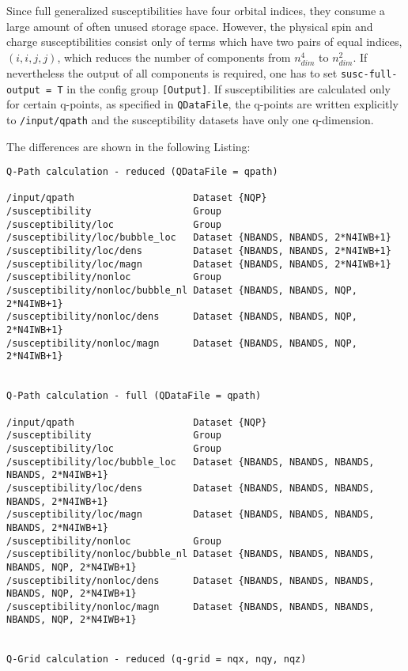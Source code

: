 \documentclass[a4paper,11pt]{article}
\numberwithin{equation}{section} %
\begin{document}
\newpage
Since full generalized susceptibilities have four orbital indices, they consume a large amount of often unused storage space. However, the physical spin and charge susceptibilities
consist only of terms which have two pairs of equal indices, $(i,i,j,j)$, which reduces the number of components from $n_{dim}^4$ to $n_{dim}^2$.
If nevertheless the output of all components is required,
one has to set \verb|susc-full-output = T| in the config group {\color{red}\verb|[Output]|}.
If susceptibilities are calculated only for certain q-points, as specified in \verb|QDataFile|, the q-points are
written explicitly to \verb|/input/qpath| and the susceptibility datasets have only one q-dimension.

The differences are shown in the following Listing:

\begin{lstlisting}[caption=susceptibility output comparison, frame=single, basicstyle=\scriptsize]
Q-Path calculation - reduced (QDataFile = qpath)

/input/qpath                     Dataset {NQP}
/susceptibility                  Group
/susceptibility/loc              Group
/susceptibility/loc/bubble_loc   Dataset {NBANDS, NBANDS, 2*N4IWB+1}
/susceptibility/loc/dens         Dataset {NBANDS, NBANDS, 2*N4IWB+1}
/susceptibility/loc/magn         Dataset {NBANDS, NBANDS, 2*N4IWB+1}
/susceptibility/nonloc           Group
/susceptibility/nonloc/bubble_nl Dataset {NBANDS, NBANDS, NQP, 2*N4IWB+1}
/susceptibility/nonloc/dens      Dataset {NBANDS, NBANDS, NQP, 2*N4IWB+1}
/susceptibility/nonloc/magn      Dataset {NBANDS, NBANDS, NQP, 2*N4IWB+1}


Q-Path calculation - full (QDataFile = qpath)

/input/qpath                     Dataset {NQP}
/susceptibility                  Group
/susceptibility/loc              Group
/susceptibility/loc/bubble_loc   Dataset {NBANDS, NBANDS, NBANDS, NBANDS, 2*N4IWB+1}
/susceptibility/loc/dens         Dataset {NBANDS, NBANDS, NBANDS, NBANDS, 2*N4IWB+1}
/susceptibility/loc/magn         Dataset {NBANDS, NBANDS, NBANDS, NBANDS, 2*N4IWB+1}
/susceptibility/nonloc           Group
/susceptibility/nonloc/bubble_nl Dataset {NBANDS, NBANDS, NBANDS, NBANDS, NQP, 2*N4IWB+1}
/susceptibility/nonloc/dens      Dataset {NBANDS, NBANDS, NBANDS, NBANDS, NQP, 2*N4IWB+1}
/susceptibility/nonloc/magn      Dataset {NBANDS, NBANDS, NBANDS, NBANDS, NQP, 2*N4IWB+1}


Q-Grid calculation - reduced (q-grid = nqx, nqy, nqz)


\end{lstlisting}
\end{document}
